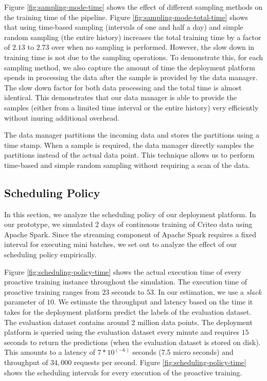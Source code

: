 Figure \ref{fig:sampling-mode-time} shows the effect of different sampling methods on the training time of the pipeline.
Figure \ref{fig:sampling-mode-total-time} shows that using time-based sampling (intervals of one and half a day) and simple random sampling (the entire history) increases the total training time by a factor of $2.13$ to $2.73$ over when no sampling is performed.
However, the slow down in training time is not due to the sampling operations.
To demonstrate this, for each sampling method, we also capture the amount of time the deployment platform spends in processing the data after the sample is provided by the data manager.
The slow down factor for both data processing and the total time is almost identical.
This demonstrates that our data manager is able to provide the samples (either from a limited time interval or the entire history) very efficiently without inuring additional overhead.

The data manager partitions the incoming data and stores the partitions using a time stamp.
When a sample is required, the data manager directly samples the partitions instead of the actual data point.
This technique allows us to perform time-based and simple random sampling without requiring a scan of the data.

\subsection{Scheduling Policy}
In this section, we analyze the scheduling policy of our deployment platform.
In our prototype, we simulated 2 days of continuous training of Criteo data using Apache Spark.
Since the streaming component of Apache Spark requires a fixed interval for executing mini batches, we set out to analyze the effect of our scheduling policy empirically.

Figure \ref{fig:scheduling-policy-time} shows the actual execution time of every proactive training instance throughout the simulation.
The execution time of proactive training ranges from $23$ seconds to $53$.
In our estimation, we use a \textit{slack} parameter of $10$.
We estimate the throughput and latency based on the time it takes for the deployment platform predict the labels of the evaluation dataset.
The evaluation dataset contains around 2 million data points.
The deployment platform is queried using the evaluation dataset every minute and requires $15$ seconds to return the predictions (when the evaluation dataset is stored on disk). 
This amounts to a latency of $7 * 10 ^ {(-6)}$ seconds (7.5 micro seconds) and throughput of $34,000$ requests per second.
Figure \ref{fig:scheduling-policy-time}  shows the scheduling intervals for every execution of the proactive training.

